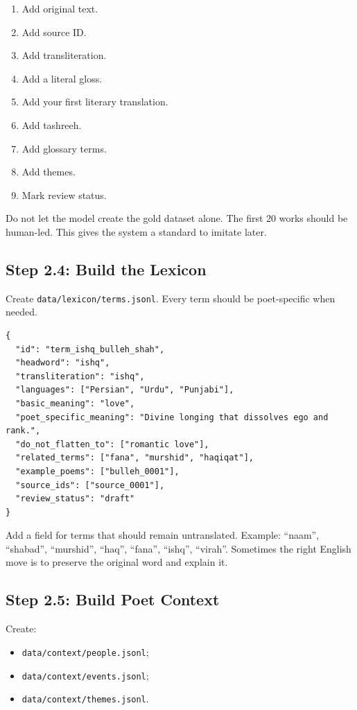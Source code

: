 \documentclass[11pt]{article}
\begin{document}
\begin{enumerate}
  \item Add original text.
  \item Add source ID.
  \item Add transliteration.
  \item Add a literal gloss.
  \item Add your first literary translation.
  \item Add tashreeh.
  \item Add glossary terms.
  \item Add themes.
  \item Mark review status.
\end{enumerate}

Do not let the model create the gold dataset alone. The first 20 works should be
human-led. This gives the system a standard to imitate later.

\subsection{Step 2.4: Build the Lexicon}

Create \verb|data/lexicon/terms.jsonl|. Every term should be poet-specific when
needed.

\begin{verbatim}
{
  "id": "term_ishq_bulleh_shah",
  "headword": "ishq",
  "transliteration": "ishq",
  "languages": ["Persian", "Urdu", "Punjabi"],
  "basic_meaning": "love",
  "poet_specific_meaning": "Divine longing that dissolves ego and rank.",
  "do_not_flatten_to": ["romantic love"],
  "related_terms": ["fana", "murshid", "haqiqat"],
  "example_poems": ["bulleh_0001"],
  "source_ids": ["source_0001"],
  "review_status": "draft"
}
\end{verbatim}

Add a field for terms that should remain untranslated. Example: ``naam'',
``shabad'', ``murshid'', ``haq'', ``fana'', ``ishq'', ``virah''. Sometimes the
right English move is to preserve the original word and explain it.

\subsection{Step 2.5: Build Poet Context}

Create:

\begin{itemize}
  \item \verb|data/context/people.jsonl|;
  \item \verb|data/context/events.jsonl|;
  \item \verb|data/context/themes.jsonl|.
\end{itemize}
\end{document}
